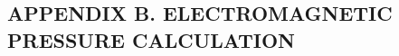 \documentclass[twoside, 10pt, ptm]{article}
\def\myvspacebeforesubsection{-2.0mm}
\def\myvspaceaftersubsection{-2.5mm}
\begin{document}
\begin{multicols}{2}








\end{multicols}

\pagebreak

\vspace{\myvspacebeforesubsection}
    \subsection*{\centering\uppercase{Appendix B. Electromagnetic pressure
calculation}}\label{appendix-b.-electromagnetic-pressure-calculation}
\vspace{\myvspaceaftersubsection}
\end{document}
